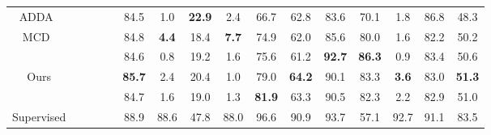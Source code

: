 \documentclass{article}
\begin{document}
\begin{table*}[t]
{\begin{threeparttable}
\begin{tabular}{ccccc ccccc cccccc}
\multicolumn{1}{c}{ADDA~\cite{tzeng2017adversarial}} &{}  &\multicolumn{1}{c}{}  &\multicolumn{1}{c}{} &\multicolumn{1}{c}{} &\multicolumn{1}{c}{84.5} &\multicolumn{1}{c}{1.0} &\multicolumn{1}{c}{\textbf{22.9}}  &\multicolumn{1}{c}{2.4} &\multicolumn{1}{c}{66.7}&\multicolumn{1}{c}{62.8} &\multicolumn{1}{c}{83.6}  &\multicolumn{1}{c}{70.1} &\multicolumn{1}{c}{1.8}&\multicolumn{1}{c}{86.8}  &\multicolumn{1}{c}{48.3}\\

\multicolumn{1}{c}{MCD~\cite{saito2018maximum}} &{}  &\multicolumn{1}{c}{}  &\multicolumn{1}{c}{} &\multicolumn{1}{c}{} &\multicolumn{1}{c}{84.8} &\multicolumn{1}{c}{\textbf{4.4}} &\multicolumn{1}{c}{18.4}  &\multicolumn{1}{c}{\textbf{7.7}} &\multicolumn{1}{c}{74.9}&\multicolumn{1}{c}{62.0} &\multicolumn{1}{c}{85.6}  &\multicolumn{1}{c}{80.0} &\multicolumn{1}{c}{1.6}&\multicolumn{1}{c}{82.2}  &\multicolumn{1}{c}{50.2}\\
\toprule
\multicolumn{1}{c}{ } &{}  &\multicolumn{1}{c}{}  &\multicolumn{1}{c}{} &\multicolumn{1}{c}{} &\multicolumn{1}{c}{84.6} &\multicolumn{1}{c}{0.8} &\multicolumn{1}{c}{19.2}  &\multicolumn{1}{c}{1.6} &\multicolumn{1}{c}{75.6}&\multicolumn{1}{c}{61.2} &\multicolumn{1}{c}{\textbf{92.7}}  &\multicolumn{1}{c}{\textbf{86.3}} &\multicolumn{1}{c}{0.9} &\multicolumn{1}{c}{83.4}  &\multicolumn{1}{c}{50.6}\\

\multicolumn{1}{c}{Ours} &{}  &\multicolumn{1}{c}{}  &\multicolumn{1}{c}{} &\multicolumn{1}{c}{} &\multicolumn{1}{c}{\textbf{85.7}} &\multicolumn{1}{c}{2.4} &\multicolumn{1}{c}{20.4}  &\multicolumn{1}{c}{1.0} &\multicolumn{1}{c}{79.0}&\multicolumn{1}{c}{\textbf{64.2}} &\multicolumn{1}{c}{90.1}  &\multicolumn{1}{c}{83.3} &\multicolumn{1}{c}{\textbf{3.6}} &\multicolumn{1}{c}{83.0}  &\multicolumn{1}{c}{\textbf{51.3}}\\

\multicolumn{1}{c}{ } &{}  &\multicolumn{1}{c}{}  &\multicolumn{1}{c}{} &\multicolumn{1}{c}{} &\multicolumn{1}{c}{84.7} &\multicolumn{1}{c}{1.6} &\multicolumn{1}{c}{19.0}  &\multicolumn{1}{c}{1.3} &\multicolumn{1}{c}{\textbf{81.9}}&\multicolumn{1}{c}{63.3} &\multicolumn{1}{c}{90.5}  &\multicolumn{1}{c}{82.3} &\multicolumn{1}{c}{2.2} &\multicolumn{1}{c}{82.9} &\multicolumn{1}{c}{51.0}\\
\toprule
\multicolumn{1}{c}{Supervised} &{}  &\multicolumn{1}{c}{}  &\multicolumn{1}{c}{} &\multicolumn{1}{c}{} &\multicolumn{1}{c}{88.9} &\multicolumn{1}{c}{88.6} &\multicolumn{1}{c}{47.8}  &\multicolumn{1}{c}{88.0} &\multicolumn{1}{c}{96.6}&\multicolumn{1}{c}{90.9} &\multicolumn{1}{c}{93.7}  &\multicolumn{1}{c}{57.1} &\multicolumn{1}{c}{92.7} &\multicolumn{1}{c}{91.1}  &\multicolumn{1}{c}{83.5}\\
\bottomrule  \end{tabular}
\renewcommand{\labelitemi}{}
\end{threeparttable}
}

\end{table*}
\end{document}
